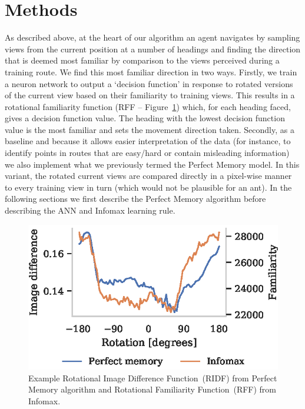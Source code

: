 \documentclass[letterpaper]{article}
\begin{document}
\section{Methods}
As described above, at the heart of our algorithm an agent navigates by sampling views from the current position at a number of headings and finding the direction that is deemed most familiar by comparison to the views perceived during a training route. 
We find this most familiar direction in two ways. 
Firstly, we train a neuron network to output a `decision function' in response to rotated versions of the current view based on their familiarity to training views.
This results in a rotational familiarity function (RFF -- Figure~\ref{fig:good_ridf}) which, for each heading faced, gives a decision function value.
The heading with the lowest decision function value is the most familiar and sets the movement direction taken.
Secondly, as a baseline and because it allows easier interpretation of the data (for instance, to identify points in routes that are easy/hard or contain misleading information) we also implement what we previously termed the Perfect Memory model. 
In this variant, the rotated current views are compared directly in a pixel-wise manner to every training view in turn (which would not be plausible for an ant). 
In the following sections we first describe the Perfect Memory algorithm before describing the ANN and Infomax learning rule.

\begin{figure}[t]
    \centering
    \includegraphics{figures/good_ridf.eps}
    \caption{Example Rotational Image Difference Function~(RIDF) from Perfect Memory algorithm and Rotational Familiarity Function~(RFF) from Infomax.}
    \label{fig:good_ridf}
\end{figure}
\end{document}
